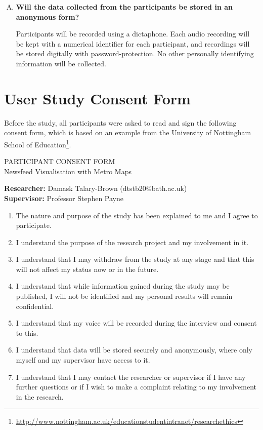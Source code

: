 \begin{enumerate}[Q.1]
	\item\textbf{Will the data collected from the participants be stored in an anonymous form?} \par
	Participants will be recorded using a dictaphone. Each audio recording will be kept with a numerical identifier for each participant, and recordings will be stored digitally with password-protection. No other personally identifying information will be collected.
\end{enumerate}

\section{User Study Consent Form}
\label{sec:consent}

Before the study, all participants were asked to read and sign the following consent form, which is based on an example from the University of Nottingham School of Education\footnote{\url{http://www.nottingham.ac.uk/educationstudentintranet/researchethics}}. \\[0.5cm]

\begin{center} PARTICIPANT CONSENT FORM \\[0.3cm] Newsfeed Visualisation with Metro Maps \end{center}

\textbf{Researcher:} Damask Talary-Brown (dtstb20@bath.ac.uk) \\
\textbf{Supervisor:} Professor Stephen Payne

\begin{enumerate}[1)]
\item The nature and purpose of the study has been explained to me and I agree to participate.

\item I understand the purpose of the research project and my involvement in it.

\item I understand that I may withdraw from the study at any stage and that this will not affect my status now or in the future.

\item I understand that while information gained during the study may be published, I will not be identified and my personal results will remain confidential.

\item I understand that my voice will be recorded during the interview and consent to this.

\item I understand that data will be stored securely and anonymously, where only myself and my supervisor have access to it.

\item I understand that I may contact the researcher or supervisor if I have any further questions or if I wish to make a complaint relating to my involvement in the research.\\[0.5cm]
\end{enumerate}

